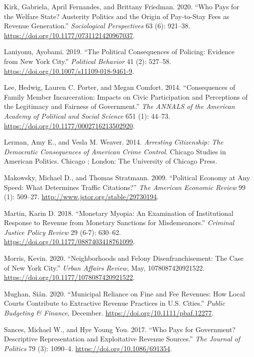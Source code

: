 \documentclass[
  12pt,
]{article}
\newlength{\cslhangindent}
\newenvironment{cslreferences}%
  {\setlength{\parindent}{0pt}%
  \everypar{\setlength{\hangindent}{\cslhangindent}}\ignorespaces}%
  {\par}
\begin{document}
\begin{cslreferences}
\leavevmode\hypertarget{ref-Kirk2020}{}%
Kirk, Gabriela, April Fernandes, and Brittany Friedman. 2020. ``Who Pays for the Welfare State? Austerity Politics and the Origin of Pay-to-Stay Fees as Revenue Generation.'' \emph{Sociological Perspectives} 63 (6): 921--38. \url{https://doi.org/10.1177/0731121420967037}.

\leavevmode\hypertarget{ref-Laniyonu2019}{}%
Laniyonu, Ayobami. 2019. ``The Political Consequences of Policing: Evidence from New York City.'' \emph{Political Behavior} 41 (2): 527--58. \url{https://doi.org/10.1007/s11109-018-9461-9}.

\leavevmode\hypertarget{ref-Lee2014}{}%
Lee, Hedwig, Lauren C. Porter, and Megan Comfort. 2014. ``Consequences of Family Member Incarceration: Impacts on Civic Participation and Perceptions of the Legitimacy and Fairness of Government.'' \emph{The ANNALS of the American Academy of Political and Social Science} 651 (1): 44--73. \url{https://doi.org/10.1177/0002716213502920}.

\leavevmode\hypertarget{ref-Lerman2014}{}%
Lerman, Amy E., and Vesla M. Weaver. 2014. \emph{Arresting Citizenship: The Democratic Consequences of American Crime Control}. Chicago Studies in American Politics. Chicago ; London: The University of Chicago Press.

\leavevmode\hypertarget{ref-Makowsky2009}{}%
Makowsky, Michael D., and Thomas Stratmann. 2009. ``Political Economy at Any Speed: What Determines Traffic Citations?'' \emph{The American Economic Review} 99 (1): 509--27. \url{http://www.jstor.org/stable/29730194}.

\leavevmode\hypertarget{ref-Martin2018}{}%
Martin, Karin D. 2018. ``Monetary Myopia: An Examination of Institutional Response to Revenue from Monetary Sanctions for Misdemeanors.'' \emph{Criminal Justice Policy Review} 29 (6-7): 630--62. \url{https://doi.org/10.1177/0887403418761099}.

\leavevmode\hypertarget{ref-Morris2020}{}%
Morris, Kevin. 2020. ``Neighborhoods and Felony Disenfranchisement: The Case of New York City.'' \emph{Urban Affairs Review}, May, 1078087420921522. \url{https://doi.org/10.1177/1078087420921522}.

\leavevmode\hypertarget{ref-Mughan2020}{}%
Mughan, Siân. 2020. ``Municipal Reliance on Fine and Fee Revenues: How Local Courts Contribute to Extractive Revenue Practices in U.S. Cities.'' \emph{Public Budgeting \& Finance}, December. \url{https://doi.org/10.1111/pbaf.12277}.

\leavevmode\hypertarget{ref-Sances2017}{}%
Sances, Michael W., and Hye Young You. 2017. ``Who Pays for Government? Descriptive Representation and Exploitative Revenue Sources.'' \emph{The Journal of Politics} 79 (3): 1090--4. \url{https://doi.org/10.1086/691354}.


\end{cslreferences}
\end{document}
